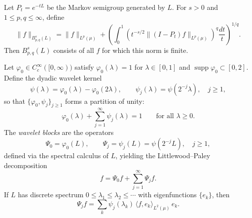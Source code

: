 \begin{definition}
	Let $P_t = e^{-tL}$ be the Markov semigroup generated by $L$.
	For $s>0$ and $1\le p,q\le\infty$, define
	\[
		\|f\|_{B^s_{p,q}(L)}
		=
		\|f\|_{L^p(\mu)}
		+
		\left(
		\int_0^1
		\left(
		t^{-s/2}
		\| (I-P_t) f \|_{L^p(\mu)}
		\right)^q
		\frac{dt}{t}
		\right)^{1/q}.
	\]
	Then $B^s_{p,q}(L)$ consists of all $f$ for which this norm is finite.
\end{definition}

\begin{definition}
	Let $\varphi_0 \in C^\infty_c([0,\infty))$ satisfy
	$\varphi_0(\lambda) = 1$ for $\lambda \in [0,1]$
	and $\operatorname{supp} \varphi_0 \subset [0,2]$.
	Define the dyadic wavelet kernel
	\[
		\psi(\lambda) = \varphi_0(\lambda) - \varphi_0(2\lambda),
		\qquad
		\psi_j(\lambda) = \psi(2^{-j}\lambda), \quad j \ge 1,
	\]
	so that $\{\varphi_0, \psi_j\}_{j \ge 1}$ forms a partition of unity:
	\[
		\varphi_0(\lambda) + \sum_{j=1}^{\infty} \psi_j(\lambda) = 1
		\qquad \text{for all } \lambda \ge 0.
	\]
	The \emph{wavelet blocks} are the operators
	\[
		\Psi_0 = \varphi_0(L),
		\qquad
		\Psi_j = \psi_j(L) = \psi(2^{-j}L), \quad j \ge 1,
	\]
	defined via the spectral calculus of $L$, yielding the
	Littlewood--Paley decomposition
	\[
		f = \Psi_0 f + \sum_{j=1}^{\infty} \Psi_j f.
	\]
	If $L$ has discrete spectrum $0 \le \lambda_1 \le \lambda_2 \le \cdots$
	with eigenfunctions $\{e_k\}$, then
	\[
		\Psi_j f
		= \sum_{k} \psi_j(\lambda_k)\, \langle f, e_k \rangle_{L^2(\mu)}\, e_k.
	\]
\end{definition}


















